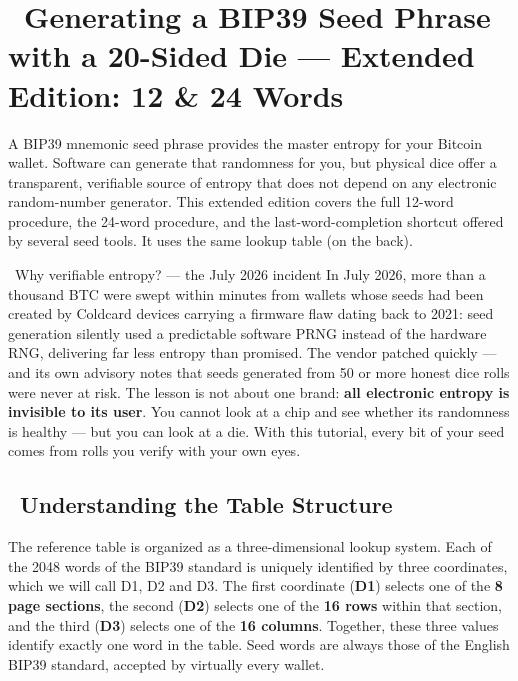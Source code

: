 \documentclass[10pt]{article}
\begin{document}
\section*{\faBitcoin~Generating a BIP39 Seed Phrase with a 20-Sided Die --- Extended Edition: 12 \& 24 Words}

\footnotesize

A BIP39 mnemonic seed phrase provides the master entropy for your Bitcoin wallet. Software can generate that randomness for you, but physical dice offer a transparent, verifiable source of entropy that does not depend on any electronic random-number generator. This extended edition covers the full 12-word procedure, the 24-word procedure, and the last-word-completion shortcut offered by several seed tools. It uses the same lookup table (on the back).

\begin{contextbox}{\faNewspaper~Why verifiable entropy? --- the July 2026 incident}
In July 2026, more than a thousand BTC were swept within minutes from wallets whose seeds had been created by Coldcard devices carrying a firmware flaw dating back to 2021: seed generation silently used a predictable software PRNG instead of the hardware RNG, delivering far less entropy than promised. The vendor patched quickly --- and its own advisory notes that seeds generated from 50 or more honest dice rolls were never at risk. The lesson is not about one brand: \textbf{all electronic entropy is invisible to its user}. You cannot look at a chip and see whether its randomness is healthy --- but you can look at a die. With this tutorial, every bit of your seed comes from rolls you verify with your own eyes.
\end{contextbox}

\subsection*{\faTable~Understanding the Table Structure}

The reference table is organized as a three-dimensional lookup system. Each of the 2048 words of the BIP39 standard is uniquely identified by three coordinates, which we will call D1, D2 and D3. The first coordinate (\textbf{D1}) selects one of the \textbf{8 page sections}, the second (\textbf{D2}) selects one of the \textbf{16 rows} within that section, and the third (\textbf{D3}) selects one of the \textbf{16 columns}. Together, these three values identify exactly one word in the table. Seed words are always those of the English BIP39 standard, accepted by virtually every wallet.
\end{document}

